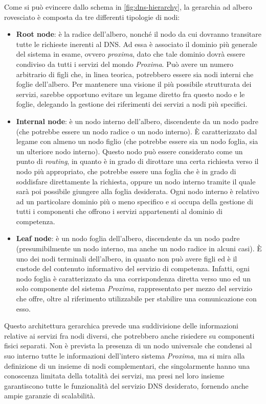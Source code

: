 \documentclass[a4paper,12pt]{report}
\begin{document}
Come si può evincere dallo schema in \autoref{fig:dns-hierarchy}, la gerarchia ad albero rovesciato è composta da tre differenti tipologie di nodi:
\begin{itemize}
	\item \textbf{Root node}: è la radice dell'albero, nonché il nodo da cui dovranno transitare tutte le richieste inerenti al DNS. Ad essa è associato il dominio più generale del sistema in esame, ovvero \emph{proxima}, dato che tale dominio dovrà essere condiviso da tutti i servizi del mondo \emph{Proxima}. Può avere un numero arbitrario di figli che, in linea teorica, potrebbero essere sia nodi interni che foglie dell'albero. Per mantenere una visione il più possibile strutturata dei servizi, sarebbe opportuno evitare un legame diretto fra questo nodo e le foglie, delegando la gestione dei riferimenti dei servizi a nodi più specifici.
	\item \textbf{Internal node}: è un nodo interno dell'albero, discendente da un nodo padre (che potrebbe essere un nodo radice o un nodo interno). È caratterizzato dal legame con almeno un nodo figlio (che potrebbe essere sia un nodo foglia, sia un ulteriore nodo interno). Questo nodo può essere considerato come un punto di \emph{routing}, in quanto è in grado di dirottare una certa richiesta verso il nodo più appropriato, che potrebbe essere una foglia che è in grado di soddisfare direttamente la richiesta, oppure un nodo interno tramite il quale sarà poi possibile giungere alla foglia desiderata. Ogni nodo interno è relativo ad un particolare dominio più o meno specifico e si occupa della gestione di tutti i componenti che offrono i servizi appartenenti al dominio di competenza.
	\item \textbf{Leaf node}: è un nodo foglia dell'albero, discendente da un nodo padre (presumibilmente un nodo interno, ma anche un nodo radice in alcuni casi). È uno dei nodi terminali dell'albero, in quanto non può avere figli ed è il custode del contenuto informativo del servizio di competenza. Infatti, ogni nodo foglia è caratterizzato da una corrispondenza diretta verso uno ed un solo componente del sistema \emph{Proxima}, rappresentato per mezzo del servizio che offre, oltre al riferimento utilizzabile per stabilire una comunicazione con esso.
\end{itemize}

Questo architettura gerarchica prevede una suddivisione delle informazioni relative ai servizi fra nodi diversi, che potrebbero anche risiedere su componenti fisici separati. Non è prevista la presenza di un nodo universale che condensi al suo interno tutte le informazioni dell'intero sistema \emph{Proxima}, ma si mira alla definizione di un insieme di nodi complementari, che singolarmente hanno una conoscenza limitata della totalità dei servizi, ma presi nel loro insieme garantiscono tutte le funzionalità del servizio DNS desiderato, fornendo anche ampie garanzie di scalabilità.
\end{document}
